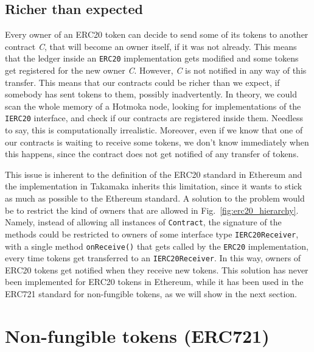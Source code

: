 \subsection{Richer than expected}\label{subsec:richer_than_expected}

Every owner of an ERC20 token can decide to send some of its tokens to another
contract \emph{C}, that will become an owner itself, if it was not already.
This means that the ledger inside
an \texttt{ERC20} implementation gets modified and some tokens get registered for
the new owner \emph{C}. However, \emph{C} is not notified in any way of this transfer.
This means that our contracts could be richer than we expect, if somebody
has sent tokens to them, possibly inadvertently. In theory, we could
scan the whole memory of a Hotmoka node, looking for implementations
of the \texttt{IERC20} interface, and check if our contracts are registered inside them.
Needless to say, this is computationally irrealistic.
Moreover, even if we know that one of our contracts is waiting to receive
some tokens, we don't know immediately when this happens, since
the contract does not get notified of any transfer of tokens.

This issue is inherent to the definition of the ERC20 standard in Ethereum
and the implementation in Takamaka inherits this limitation, since it wants to stick
as much as possible to the Ethereum standard. A solution to the problem
would be to restrict the kind of owners that are allowed in Fig.~\ref{fig:erc20_hierarchy}.
Namely, instead of allowing all instances of \texttt{Contract}, the signature of the methods could
be restricted to owners of some interface type \texttt{IERC20Receiver}, with a single method
\texttt{onReceive()} that gets called by the \texttt{ERC20} implementation, every time
tokens get transferred to an \texttt{IERC20Receiver}.
In this way, owners of ERC20 tokens get notified when they receive new tokens.
This solution has never been implemented for ERC20 tokens in Ethereum, while
it has been used in the ERC721 standard for non-fungible tokens, as we will
show in the next section.

\section{Non-fungible tokens (ERC721)}\label{sec:non_fungible_tokens}

